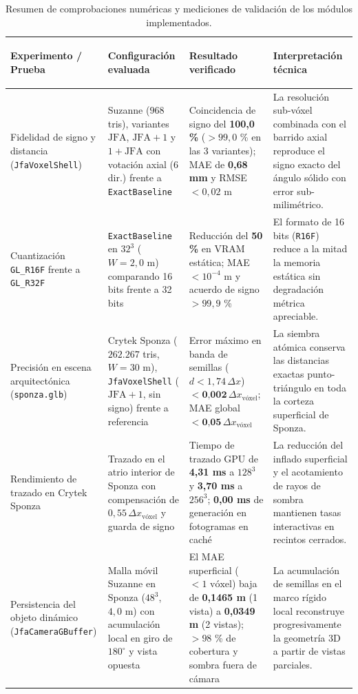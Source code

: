 \begin{table}[htbp]
  \centering
  \footnotesize
  \caption{Resumen de comprobaciones numéricas y mediciones de validación de los módulos implementados.}
  \label{tab:verificacion_preliminar_pec3}
  \begin{tabularx}{\textwidth}{|>{\bfseries\raggedright\arraybackslash}p{33mm}|>{\raggedright\arraybackslash}p{35mm}|>{\raggedright\arraybackslash}p{35mm}|>{\raggedright\arraybackslash}X|}
    \hline
    \rowcolor{tablegray} Experimento / Prueba & Configuración evaluada & Resultado verificado & Interpretación técnica \\ \hline
    Fidelidad de signo y distancia (\texttt{JfaVoxelShell}) & Suzanne ($968$ tris), variantes $\text{JFA}$, $\text{JFA}+1$ y $1+\text{JFA}$ con votación axial (6 dir.) frente a \texttt{ExactBaseline} & Coincidencia de signo del \textbf{100,0 \%} ($> 99,0$ \% en las 3 variantes); MAE de \textbf{0,68 mm} y RMSE $< 0,02\text{ m}$ & La resolución sub-vóxel combinada con el barrido axial reproduce el signo exacto del ángulo sólido con error sub-milimétrico. \\ \hline
    Cuantización \texttt{GL\_R16F} frente a \texttt{GL\_R32F} & \texttt{ExactBaseline} en $32^3$ ($W = 2,0\text{ m}$) comparando 16 bits frente a 32 bits & Reducción del \textbf{50 \%} en VRAM estática; MAE $< 10^{-4}\text{ m}$ y acuerdo de signo $> 99,9$ \% & El formato de 16 bits (\texttt{R16F}) reduce a la mitad la memoria estática sin degradación métrica apreciable. \\ \hline
    Precisión en escena arquitectónica (\texttt{sponza.glb}) & Crytek Sponza ($262.267$ tris, $W = 30\text{ m}$), \texttt{JfaVoxelShell} ($\text{JFA}+1$, sin signo) frente a referencia & Error máximo en banda de semillas ($d < 1,74\,\Delta x$) $< \textbf{0,002}\,\Delta x_{\text{vóxel}}$; MAE global $< \textbf{0,05}\,\Delta x_{\text{vóxel}}$ & La siembra atómica conserva las distancias exactas punto-triángulo en toda la corteza superficial de Sponza. \\ \hline
    Rendimiento de trazado en Crytek Sponza & Trazado en el atrio interior de Sponza con compensación de $0,55\,\Delta x_{\text{vóxel}}$ y guarda de signo & Tiempo de trazado GPU de \textbf{4,31 ms} a $128^3$ y \textbf{3,70 ms} a $256^3$; \textbf{0,00 ms} de generación en fotogramas en caché & La reducción del inflado superficial y el acotamiento de rayos de sombra mantienen tasas interactivas en recintos cerrados. \\ \hline
    Persistencia del objeto dinámico (\texttt{JfaCameraGBuffer}) & Malla móvil Suzanne en Sponza ($48^3$, $4,0\text{ m}$) con acumulación local en giro de $180^\circ$ y vista opuesta & El MAE superficial ($< 1\text{ vóxel}$) baja de \textbf{0,1465 m} (1 vista) a \textbf{0,0349 m} (2 vistas); $> 98$ \% de cobertura y sombra fuera de cámara & La acumulación de semillas en el marco rígido local reconstruye progresivamente la geometría 3D a partir de vistas parciales. \\ \hline

\end{tabularx}
\end{table}
